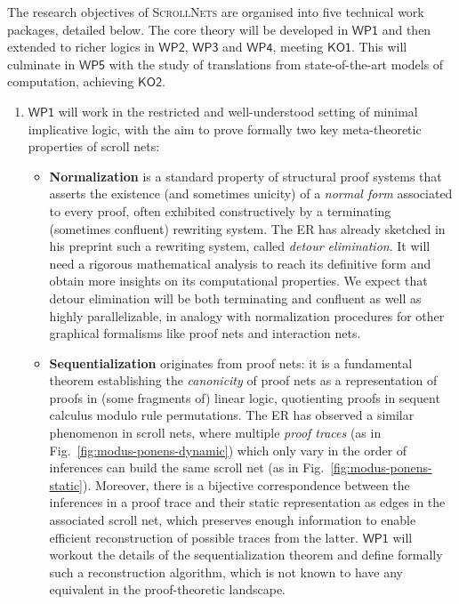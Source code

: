 \documentclass[12pt,draftproposal]{msca-pf}
\newcommand{\proj}{\small\textsc{ScrollNets}}
\newcommand{\KO}[1]{$\mathsf{KO#1}$}
\newcommand{\WP}[1]{$\mathsf{WP#1}$}
\begin{document}
The research objectives of {\proj} are organised into five technical work packages, detailed below.
The core theory will be developed in \WP{1} and then extended to richer logics in \WP{2}, \WP{3} and
\WP{4}, meeting \KO{1}. This will culminate in \WP{5} with the study of translations from
state-of-the-art models of computation, achieving \KO{2}.
\begin{enumerate}
    \item \WP{1} will work in the restricted and well-understood setting of minimal implicative
    logic, with the aim to prove formally two key meta-theoretic properties of scroll nets:
    \begin{itemize}
        \item \textbf{Normalization} is a standard property of structural proof
        systems that asserts the existence (and sometimes unicity) of a \emph{normal form} associated to
        every proof, often exhibited constructively by a terminating (sometimes confluent) rewriting
        system. The ER has already sketched in his preprint such a rewriting system, called \emph{detour
        elimination}. It will need a rigorous mathematical analysis to reach its definitive form and
        obtain more insights on its computational properties. We expect that detour elimination will be
        both terminating and confluent as well as highly parallelizable, in analogy with normalization
        procedures for other graphical formalisms like proof nets and interaction nets.

        \item \textbf{Sequentialization} originates from proof nets: it is a fundamental theorem establishing the
        \emph{canonicity} of proof nets as a representation of proofs in (some fragments of) linear
        logic, quotienting proofs in sequent calculus modulo rule permutations. The ER has observed a
        similar phenomenon in scroll nets, where multiple \emph{proof traces} (as in
        Fig.~\ref{fig:modus-ponens-dynamic}) which only vary in the order of inferences can build the
        same scroll net (as in Fig.~\ref{fig:modus-ponens-static}). Moreover, there is a bijective
        correspondence between the inferences in a proof trace and their static representation as edges
        in the associated scroll net, which preserves enough information to enable efficient
        reconstruction of possible traces from the latter. \WP{1} will workout the details of the
        sequentialization theorem and define formally such a reconstruction algorithm, which is not
        known to have any equivalent in the proof-theoretic landscape.
    \end{itemize}
    

\end{enumerate}
\end{document}
